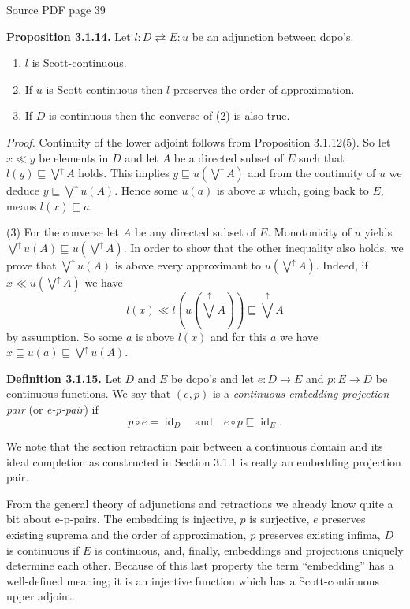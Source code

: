 \documentclass[11pt]{article}
\newcommand{\leanmarker}[2]{%
  \Needspace{3\baselineskip}%
  \marginnote{\hyperlink{#1}{\color{LeanTeal}\fbox{\scriptsize Lean}}}%
  \hypertarget{#1}{\textbf{#2.}}%
}
\newcommand{\sourcepage}[1]{\par\medskip\noindent\textcolor{SourceGray}{\scriptsize Source PDF page #1}\par\smallskip}
\begin{document}
\sourcepage{39}
\leanmarker{prop-3-1-14}{Proposition 3.1.14} Let $l:D\rightleftarrows E:u$ be an adjunction between dcpo's.
\begin{enumerate}
\item $l$ is Scott-continuous.
\item If $u$ is Scott-continuous then $l$ preserves the order of approximation.
\item If $D$ is continuous then the converse of (2) is also true.
\end{enumerate}

\emph{Proof.} Continuity of the lower adjoint follows from Proposition 3.1.12(5). So let $x\ll y$ be elements in $D$ and let $A$ be a directed subset of $E$ such that $l(y)\sqsubseteq \bigvee^{\uparrow} A$ holds. This implies $y\sqsubseteq u(\bigvee^{\uparrow}A)$ and from the continuity of $u$ we deduce $y\sqsubseteq \bigvee^{\uparrow}u(A)$. Hence some $u(a)$ is above $x$ which, going back to $E$, means $l(x)\sqsubseteq a$.

(3) For the converse let $A$ be any directed subset of $E$. Monotonicity of $u$ yields $\bigvee^{\uparrow}u(A)\sqsubseteq u(\bigvee^{\uparrow} A)$. In order to show that the other inequality also holds, we prove that $\bigvee^{\uparrow}u(A)$ is above every approximant to $u(\bigvee^{\uparrow}A)$. Indeed, if $x\ll u(\bigvee^{\uparrow}A)$ we have
\[
  l(x)\ll l\left(u\left(\bigvee^{\uparrow}A\right)\right)\sqsubseteq \bigvee^{\uparrow}A
\]
by assumption. So some $a$ is above $l(x)$ and for this $a$ we have $x\sqsubseteq u(a)\sqsubseteq \bigvee^{\uparrow}u(A)$.

\leanmarker{def-3-1-15}{Definition 3.1.15} Let $D$ and $E$ be dcpo's and let $e:D\to E$ and $p:E\to D$ be continuous functions. We say that $(e,p)$ is a \emph{continuous embedding projection pair} (or \emph{e-p-pair}) if
\[
  p\circ e=\operatorname{id}_D \quad\text{and}\quad e\circ p\sqsubseteq \operatorname{id}_E.
\]

We note that the section retraction pair between a continuous domain and its ideal completion as constructed in Section 3.1.1 is really an embedding projection pair.

From the general theory of adjunctions and retractions we already know quite a bit about e-p-pairs. The embedding is injective, $p$ is surjective, $e$ preserves existing suprema and the order of approximation, $p$ preserves existing infima, $D$ is continuous if $E$ is continuous, and, finally, embeddings and projections uniquely determine each other. Because of this last property the term ``embedding'' has a well-defined meaning; it is an injective function which has a Scott-continuous upper adjoint.
\end{document}
